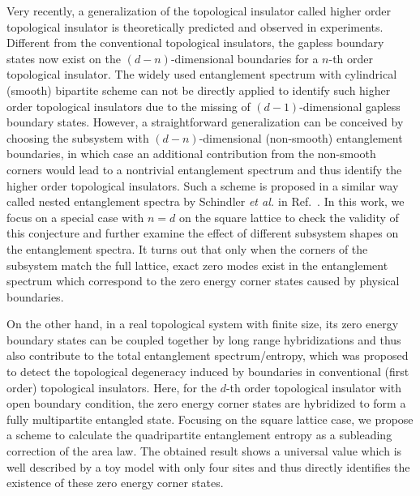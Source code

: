 \documentclass[twocolumn,superscriptaddress]{revtex4-1}
\newcommand{\etal}{\textit{et al.{ }}}
\begin{document}
Very recently, a generalization of the topological insulator called higher order topological insulator is theoretically predicted and observed in experiments. \cite{Benalcazar_S_2017, Benalcazar_PRB_2017, Schindler_SA_2018, Song_PRL_2017, Parameswaran_P_2017, Xu_a_2017, Ezawa_PRL_2018, Ezawa_PRB_2018, Kunst_PRB_2018, Schindler_a_2018} Different from the conventional topological insulators, the gapless boundary states now exist on the $(d-n)$-dimensional boundaries for a $n$-th order topological insulator. The widely used entanglement spectrum with cylindrical (smooth) bipartite scheme can not be directly applied to identify such higher order topological insulators due to the missing of $(d-1)$-dimensional gapless boundary states. However, a straightforward generalization can be conceived by choosing the subsystem with $(d-n)$-dimensional (non-smooth) entanglement boundaries, in which case an additional contribution from the non-smooth corners \cite{Laflorencie_PR_2016} would lead to a nontrivial entanglement spectrum and thus identify the higher order topological insulators. Such a scheme is proposed in a similar way called nested entanglement spectra by Schindler \etal in Ref.~. In this work, we focus on a special case with $n=d$ on the square lattice to check the validity of this conjecture and further examine the effect of different subsystem shapes on the entanglement spectra. It turns out that only when the corners of the subsystem match the full lattice, exact zero modes exist in the entanglement spectrum which correspond to the zero energy corner states caused by physical boundaries.

On the other hand, in a real topological system with finite size, its zero energy boundary states can be coupled together by long range hybridizations and thus also contribute to the total entanglement spectrum/entropy, which was proposed to detect the topological degeneracy induced by boundaries in conventional (first order) topological insulators. \cite{Wang_PRB_2015} Here, for the $d$-th order topological insulator with open boundary condition, the zero energy corner states are hybridized to form a fully multipartite entangled state. Focusing on the square lattice case, we propose a scheme to calculate the quadripartite entanglement entropy as a subleading correction of the area law. The obtained result shows a universal value which is well described by a toy model with only four sites and thus directly identifies the existence of these zero energy corner states. 
\end{document}
